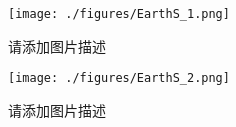 
\begin{issues}
\issueDraft
\end{issues}

\begin{figure}[ht]
\centering
\texttt{[image: ./figures/EarthS\_1.png]}
\caption{请添加图片描述} \label{EarthS_fig1}
\end{figure}

\begin{figure}[ht]
\centering
\texttt{[image: ./figures/EarthS\_2.png]}
\caption{请添加图片描述} \label{EarthS_fig2}
\end{figure}
